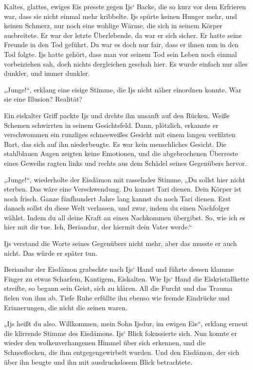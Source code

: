 Kaltes, glattes, ewiges Eis presste gegen Ijs‘ Backe, die so kurz vor dem Erfrieren war, dass sie nicht einmal mehr kribbelte. Ijs spürte keinen Hunger mehr, und keinen Schmerz, nur noch eine wohlige Wärme, die sich in seinem Körper ausbreitete. Er war der letzte Überlebende, da war er sich sicher. Er hatte seine Freunde in den Tod geführt. Da war es doch nur fair, dass er ihnen nun in den Tod folgte. Ijs hatte gehört, dass man vor seinem Tod sein Leben noch einmal vorbeiziehen sah, doch nichts dergleichen geschah hier. Es wurde einfach nur alles dunkler, und immer dunkler.

„Junge!“, erklang eine eisige Stimme, die Ijs nicht näher einordnen konnte. War sie eine Illusion? Realität?

Ein eiskalter Griff packte Ijs und drehte ihn unsanft auf den Rücken. Weiße Schemen schwirrten in seinem Gesichtsfeld. Dann, plötzlich, erkannte er verschwommen ein runzliges schneeweißes Gesicht mit einem langen verfilzten Bart, das sich auf ihn niederbeugte. Es war kein menschliches Gesicht. Die stahlblauen Augen zeigten keine Emotionen, und die abgebrochenen Überreste eines Geweihs ragten links und rechts aus dem Schädel seines Gegenübers hervor.

„Junge!“, wiederholte der Eisdämon mit rasselnder Stimme, „Du sollst hier nicht sterben. Das wäre eine Verschwendung. Du kannst Tari dienen. Dein Körper ist noch frisch. Ganze fünfhundert Jahre lang kannst du noch Tari dienen. Erst danach sollst du diese Welt verlassen, und zwar, indem du einen Nachfolger wählst. Indem du all deine Kraft an einen Nachkommen übergibst. So, wie ich es hier mit dir tue. Ich, Beriandur, der hiermit dein Vater werde.“

Ijs verstand die Worte seines Gegenübers nicht mehr, aber das musste er auch nicht. Das würde er später tun.

Beriandur der Eisdämon grabschte nach Ijs‘ Hand und führte dessen klamme Finger zu etwas Scharfem, Kantigem, Eiskalten. Wie Ijs‘ Hand die Eiskristallkette streifte, so begann sein Geist, sich zu klären. All die Furcht und das Trauma fielen von ihm ab. Tiefe Ruhe erfüllte ihn ebenso wie fremde Eindrücke und Erinnerungen, die nicht die seinen waren.

„Ijs heißt du also. Willkommen, mein Sohn Ijsdur, im ewigen Eis“, erklang erneut die klirrende Stimme des Eisdämons. Ijs‘ Blick fokussierte sich. Nun konnte er wieder den wolkenverhangenen Himmel über sich erkennen, und die Schneeflocken, die ihm entgegengewirbelt wurden. Und den Eisdämon, der sich über ihn beugte und ihn mit ausdruckslosem Blick betrachtete.

